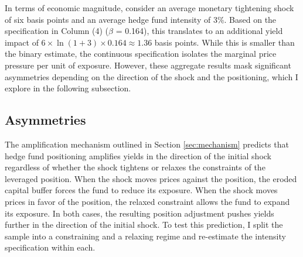 \documentclass[english, 11pt, oneside]{article}
\begin{document}
In terms of economic magnitude, consider an average monetary tightening shock of six basis points and an average hedge fund intensity of 3\%. Based on the specification in Column (4) ($\beta$ = 0.164), this translates to an additional yield impact of $6 \times \ln(1 + 3) \times 0.164 \approx 1.36$ basis points. While this is smaller than the binary estimate, the continuous specification isolates the marginal price pressure per unit of exposure. However, these aggregate results mask significant asymmetries depending on the direction of the shock and the positioning, which I explore in the following subsection.



\subsection{Asymmetries}
\label{subsec:asymmetries}

The amplification mechanism outlined in Section \ref{sec:mechanism} predicts that hedge fund positioning amplifies yields in the direction of the initial shock regardless of whether the shock tightens or relaxes the constraints of the leveraged position. When the shock moves prices against the position, the eroded capital buffer forces the fund to reduce its exposure. When the shock moves prices in favor of the position, the relaxed constraint allows the fund to expand its exposure. In both cases, the resulting position adjustment pushes yields further in the direction of the initial shock. To test this prediction, I split the sample into a constraining and a relaxing regime and re-estimate the intensity specification within each.
\end{document}
